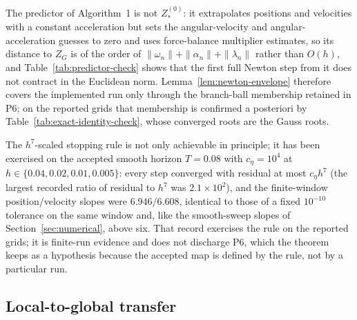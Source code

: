 \documentclass[preprint,12pt]{elsarticle}
\begin{document}
The predictor of Algorithm~1 is not $Z^{(0)}_\ast$: it extrapolates
positions and velocities with a constant acceleration but sets the
angular-velocity and angular-acceleration guesses to zero and uses
force-balance multiplier estimates, so its distance to $Z_G$ is of the order
of $\|\omega_n\|+\|\alpha_n\|+\|\lambda_n\|$ rather than $O(h)$, and
Table~\ref{tab:predictor-check} shows that the first full Newton step from
it does not contract in the Euclidean norm. Lemma~\ref{lem:newton-envelope}
therefore covers the implemented run only through the branch-ball membership
retained in P6; on the reported grids that membership is confirmed a
posteriori by Table~\ref{tab:exact-identity-check}, whose converged roots are
the Gauss roots.

The $h^7$-scaled stopping rule is not only achievable in principle; it has
been exercised on the accepted smooth horizon $T=0.08$ with $c_\eta=10^4$ at
$h\in\{0.04,0.02,0.01,0.005\}$: every step converged with residual at most
$c_\eta h^7$ (the largest recorded ratio of residual to $h^7$ was
$2.1\times10^{2}$), and the finite-window position/velocity slopes were
$6.946/6.608$, identical to those of a fixed $10^{-10}$ tolerance on the same
window and, like the smooth-sweep slopes of Section~\ref{sec:numerical},
above six. That record exercises the rule on the reported grids; it is
finite-run evidence and does not discharge P6, which the theorem keeps as a
hypothesis because the accepted map is defined by the rule, not by a
particular run.

\subsection{Local-to-global transfer}
\end{document}
